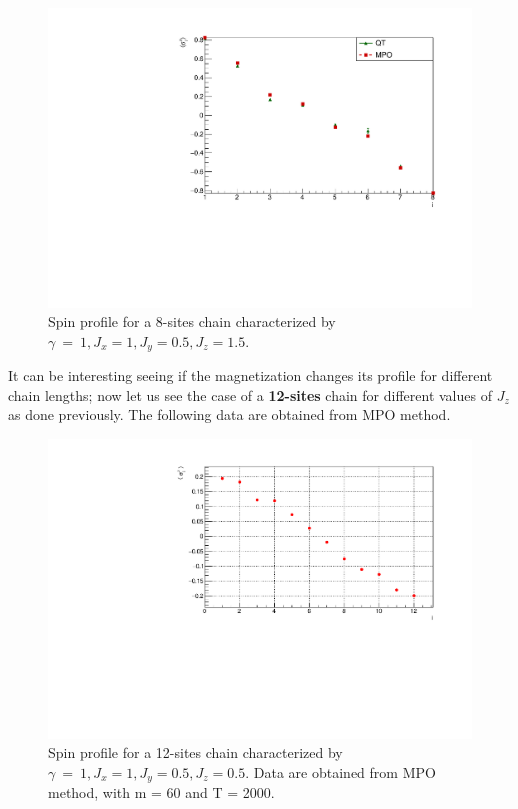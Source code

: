 \begin{figure}[H]
    \centering
    \includegraphics[scale=0.7]{Figures/8sites/LMComparison_8sJ10515.pdf}
    \caption{Spin profile for a 8-sites chain characterized by $\gamma~=~1, J_x=1, J_y=0.5, J_z=1.5$.}
    \label{fig:LMComparison_8sJ10515}
\end{figure}

It can be interesting seeing if the magnetization changes its profile for different chain lengths; now let us see the case of a \textbf{12-sites} chain for different values of $J_z$ as done previously. The following data are obtained from MPO method.

\begin{figure}[H]
    \centering
    \includegraphics[scale=0.7]{Figures/12sites/LML012m060Time002000_J10505.pdf}
    \caption{Spin profile for a 12-sites chain characterized by $\gamma~=~1, J_x=1, J_y=0.5, J_z=0.5$. Data are obtained from MPO method, with m = 60 and T = 2000.}
    \label{fig:my_label}
\end{figure}

